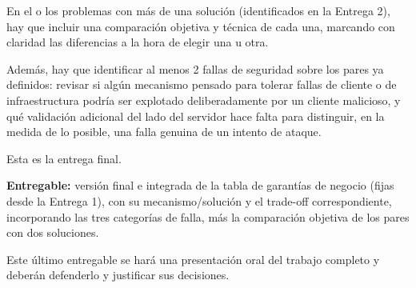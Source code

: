 \documentclass[variant=guia,cover=institutional,mode=screen]{ua-engineering-v6-article}
\begin{document}
    En el o los problemas con más de una solución (identificados en la Entrega 2), hay que incluir una comparación objetiva y técnica de cada una, marcando con claridad las diferencias a la hora de elegir una u otra.

    Además, hay que identificar al menos 2 fallas de seguridad sobre los pares ya definidos: revisar si algún mecanismo pensado para tolerar fallas de cliente o de infraestructura podría ser explotado deliberadamente por un cliente malicioso, y qué validación adicional del lado del servidor hace falta para distinguir, en la medida de lo posible, una falla genuina de un intento de ataque.

    Esta es la entrega final.

    \textbf{Entregable:} versión final e integrada de la tabla de garantías de negocio (fijas desde la Entrega 1), con su mecanismo/solución y el trade-off correspondiente, incorporando las tres categorías de falla, más la comparación objetiva de los pares con dos soluciones.

    Este último entregable se hará una presentación oral del trabajo completo y deberán defenderlo y justificar sus decisiones.
\end{document}
